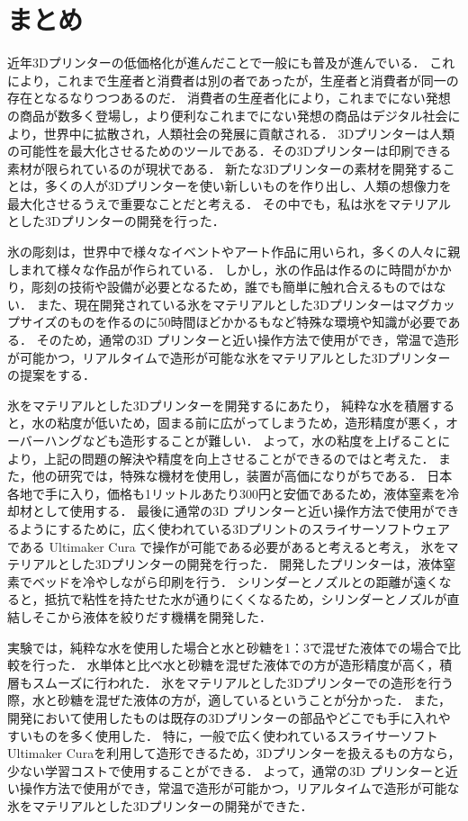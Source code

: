 \chapter{まとめ}
\label{chp:first}

近年3Dプリンターの低価格化が進んだことで一般にも普及が進んでいる．
これにより，これまで生産者と消費者は別の者であったが，生産者と消費者が同一の存在となるなりつつあるのだ．
消費者の生産者化により，これまでにない発想の商品が数多く登場し，より便利なこれまでにない発想の商品はデジタル社会により，世界中に拡散され，人類社会の発展に貢献される．
3Dプリンターは人類の可能性を最大化させるためのツールである．その3Dプリンターは印刷できる素材が限られているのが現状である．
新たな3Dプリンターの素材を開発することは，多くの人が3Dプリンターを使い新しいものを作り出し、人類の想像力を最大化させるうえで重要なことだと考える．
その中でも，私は氷をマテリアルとした3Dプリンターの開発を行った．

氷の彫刻は，世界中で様々なイベントやアート作品に用いられ，多くの人々に親しまれて様々な作品が作られている．
しかし，氷の作品は作るのに時間がかかり，彫刻の技術や設備が必要となるため，誰でも簡単に触れ合えるものではない．
また、現在開発されている氷をマテリアルとした3Dプリンターはマグカップサイズのものを作るのに50時間ほどかかるもなど特殊な環境や知識が必要である．
そのため，通常の3D プリンターと近い操作方法で使用ができ，常温で造形が可能かつ，リアルタイムで造形が可能な氷をマテリアルとした3Dプリンターの提案をする．

氷をマテリアルとした3Dプリンターを開発するにあたり，
純粋な水を積層すると，水の粘度が低いため，固まる前に広がってしまうため，造形精度が悪く，オーバーハングなども造形することが難しい．
よって，水の粘度を上げることにより，上記の問題の解決や精度を向上させることができるのではと考えた．
また，他の研究では，特殊な機材を使用し，装置が高価になりがちである．
日本各地で手に入り，価格も1リットルあたり300円と安価であるため，液体窒素を冷却材として使用する．
最後に通常の3D プリンターと近い操作方法で使用ができるようにするために，広く使われている3Dプリントのスライサーソフトウェアである Ultimaker Cura で操作が可能である必要があると考えると考え，
氷をマテリアルとした3Dプリンターの開発を行った．
開発したプリンターは，液体窒素でベッドを冷やしながら印刷を行う．
シリンダーとノズルとの距離が遠くなると，抵抗で粘性を持たせた水が通りにくくなるため，シリンダーとノズルが直結しそこから液体を絞りだす機構を開発した．


実験では，純粋な水を使用した場合と水と砂糖を1：3で混ぜた液体での場合で比較を行った．
水単体と比べ水と砂糖を混ぜた液体での方が造形精度が高く，積層もスムーズに行われた．
氷をマテリアルとした3Dプリンターでの造形を行う際，水と砂糖を混ぜた液体の方が，適しているということが分かった．
また，開発において使用したものは既存の3Dプリンターの部品やどこでも手に入れやすいものを多く使用した．
特に，一般で広く使われているスライサーソフトUltimaker Curaを利用して造形できるため，3Dプリンターを扱えるもの方なら，少ない学習コストで使用することができる．
よって，通常の3D プリンターと近い操作方法で使用ができ，常温で造形が可能かつ，リアルタイムで造形が可能な氷をマテリアルとした3Dプリンターの開発ができた．


